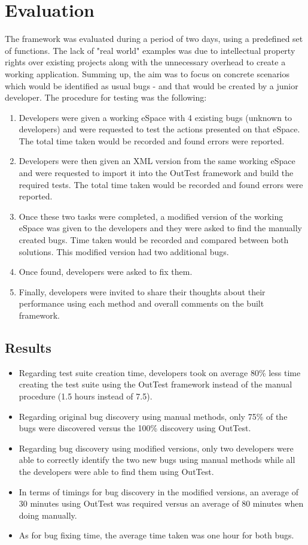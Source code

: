 \documentclass{sigchi}
\begin{document}
\section{Evaluation}
The framework was evaluated during a period of two days, using a predefined set of functions. The lack of "real world" examples was due to intellectual property rights over existing projects along with the unnecessary overhead to create a working application. Summing up, the aim was to focus on concrete scenarios which would be identified as usual bugs - and that would be created by a junior developer.
The procedure for testing was the following: 
\begin{enumerate}
	\item Developers were given a working eSpace with 4 existing bugs (unknown to developers) and were requested to test the actions presented on that eSpace. The total time taken would be recorded and found errors were reported.
	\item Developers were then given an XML version from the same working eSpace and were requested to import it into the OutTest framework and build the required tests. The total time taken would be recorded and found errors were reported.
	\item Once these two tasks were completed, a modified version of the working eSpace was given to the developers and they were asked to find the manually created bugs. Time taken would be recorded and compared between both solutions. This modified version had two additional bugs.
	\item Once found, developers were asked to fix them.
	\item Finally, developers were invited to share their thoughts about their performance using each method and overall comments on the built framework.
\end{enumerate}

\subsection{Results}
\begin{itemize}
	\item Regarding test suite creation time, developers took on average 80\% less time creating the test suite using the OutTest framework instead of the manual procedure (1.5 hours instead of 7.5).
	\item Regarding original bug discovery using manual methods, only 75\% of the bugs were discovered versus the 100\% discovery using OutTest.
	\item Regarding bug discovery using modified versions, only two developers were able to correctly identify the two new bugs using manual methods while all the developers were able to find them using OutTest.
	\item In terms of timings for bug discovery in the modified versions, an average of 30 minutes using OutTest was required versus an average of 80 minutes when doing manually. 
	\item As for bug fixing time, the average time taken was one hour for both bugs.
\end{itemize}
\end{document}
